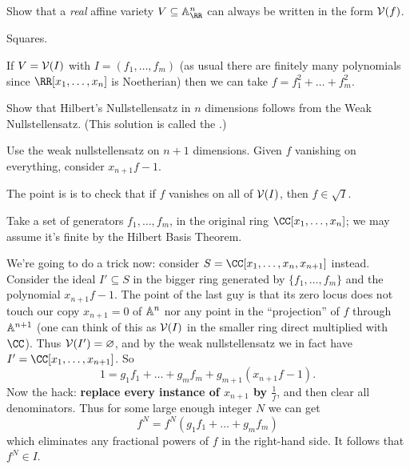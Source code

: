 \begin{problem}
	Show that a \emph{real} affine variety $V \subseteq \Aff_\RR^n$
	can always be written in the form $\mathcal V(f)$.
	\begin{hint}
		Squares.
	\end{hint}
	\begin{sol}
		If $V = \mathcal V(I)$ with $I = (f_1, \dots, f_m)$
		(as usual there are finitely many polynomials since $\RR[x_1, \dots, x_n]$ is Noetherian)
		then we can take $f = f_1^2 + \dots + f_m^2$.
	\end{sol}
\end{problem}

\begin{problem}
	\kurumi
	Show that Hilbert's Nullstellensatz in $n$ dimensions
	follows from the Weak Nullstellensatz.
	(This solution is called the .)
	\begin{hint}
		Use the weak nullstellensatz on $n+1$ dimensions.
		Given $f$ vanishing on everything,
		consider $x_{n+1}f-1$. 
	\end{hint}
	\begin{sol}
		The point is is to check that if $f$ vanishes on all of $\mathcal V(I)$,
		then $f \in \sqrt I$.

		Take a set of generators $f_1, \dots, f_m$,
		in the original ring $\CC[x_1, \dots, x_n]$;
		we may assume it's finite by the Hilbert Basis Theorem.

		We're going to do a trick now:
		consider $S = \CC[x_1, \dots, x_n, x_{n+1}]$ instead.
		Consider the ideal $I' \subseteq S$ in the bigger ring
		generated by $\{f_1, \dots, f_m\}$ and the polynomial $x_{n+1} f - 1$.
		The point of the last guy is that its zero locus
		does not touch our copy $x_{n+1}=0$ of $\mathbb A^n$
		nor any point in the ``projection'' of $f$ through $\mathbb A^{n+1}$
		(one can think of this as $\mathcal V(I)$ in the smaller ring
		direct multiplied with $\CC$).
		Thus $\mathcal V(I') = \varnothing$, and by the weak nullstellensatz
		we in fact have $I' = \CC[x_1, \dots, x_{n+1}]$.
		So
		\[ 1 = g_1f_1 + \dots + g_mf_m + g_{m+1} \left( x_{n+1}f-1 \right). \]
		Now the hack: \textbf{replace every instance of $x_{n+1}$ by $\frac 1f$},
		and then clear all denominators.
		Thus for some large enough integer $N$ we can get
		\[ f^N = f^N(g_1f_1 + \dots + g_mf_m) \]
		which eliminates any fractional powers of $f$ in the right-hand side.
		It follows that $f^N \in I$.
	\end{sol}
\end{problem}


